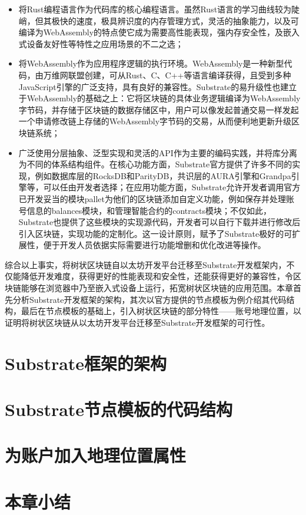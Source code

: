 \begin{itemize}
    \item 将Rust编程语言作为代码库的核心编程语言。虽然Rust语言的学习曲线较为陡峭，但其极快的速度，极具辨识度的内存管理方式，灵活的抽象能力，以及可编译为WebAssembly的特点使它成为需要高性能表现，强内存安全性，及嵌入式设备友好性等特性之应用场景的不二之选；
    \item 将WebAssembly作为应用程序逻辑的执行环境。WebAssembly是一种新型代码，由万维网联盟创建，可从Rust、C、C++等语言编译获得，且受到多种JavaScript引擎的广泛支持，具有良好的兼容性\cite{wasmIntro}。Substrate的易升级性也建立于WebAssembly的基础之上：它将区块链的具体业务逻辑编译为WebAssembly字节码，并存储于区块链的数据存储区中，用户可以像发起普通交易一样发起一个申请修改链上存储的WebAssembly字节码的交易，从而便利地更新升级区块链系统；
    \item 广泛使用分层抽象、泛型实现和灵活的API作为主要的编码实践，并将库分离为不同的体系结构组件。在核心功能方面，Substrate官方提供了许多不同的实现，例如数据库层的RocksDB和ParityDB，共识层的AURA引擎和Grandpa引擎等，可以任由开发者选择；在应用功能方面，Substrate允许开发者调用官方已开发妥当的模块pallet为他们的区块链添加自定义功能，例如保存并处理账号信息的balances模块，和管理智能合约的contracts模块；不仅如此，Substrate也提供了这些模块的实现源代码，开发者可以自行下载并进行修改后引入区块链，实现功能的定制化。这一设计原则，赋予了Substrate极好的可扩展性，便于开发人员依据实际需要进行功能增删和优化改进等操作。
\end{itemize}

综合以上事实，将树状区块链自以太坊开发平台迁移至Substrate开发框架内，不仅能降低开发难度，获得更好的性能表现和安全性，还能获得更好的兼容性，令区块链能够在浏览器中乃至嵌入式设备上运行，拓宽树状区块链的应用范围。本章首先分析Substrate开发框架的架构，其次以官方提供的节点模板为例介绍其代码结构，最后在节点模板的基础上，引入树状区块链的部分特性——账号地理位置，以证明将树状区块链从以太坊开发平台迁移至Substrate开发框架的可行性。

\section{Substrate框架的架构}

\section{Substrate节点模板的代码结构}

\section{为账户加入地理位置属性}

\section{本章小结}

